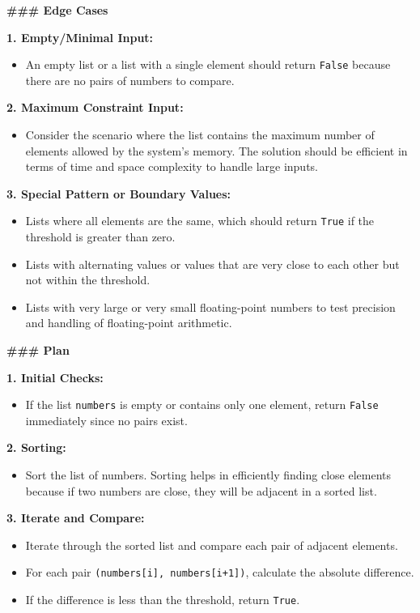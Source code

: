 \documentclass[11pt]{article}
\begin{document}
\begin{tcolorbox}[breakable, colback=white, colframe=black!70, boxrule=0.5pt, arc=2pt, left=4mm, right=4mm, top=3mm, bottom=3mm]
\textbf{\#\#\# Edge Cases}

\textbf{1. Empty/Minimal Input:}
\begin{itemize}
    \item An empty list or a list with a single element should return \texttt{False} because there are no pairs of numbers to compare.
\end{itemize}

\textbf{2. Maximum Constraint Input:}
\begin{itemize}
    \item Consider the scenario where the list contains the maximum number of elements allowed by the system's memory. The solution should be efficient in terms of time and space complexity to handle large inputs.
\end{itemize}

\textbf{3. Special Pattern or Boundary Values:}
\begin{itemize}
    \item Lists where all elements are the same, which should return \texttt{True} if the threshold is greater than zero.
    \item Lists with alternating values or values that are very close to each other but not within the threshold.
    \item Lists with very large or very small floating-point numbers to test precision and handling of floating-point arithmetic.
\end{itemize}

\textbf{\#\#\# Plan}

\textbf{1. Initial Checks:}
\begin{itemize}
    \item If the list \texttt{numbers} is empty or contains only one element, return \texttt{False} immediately since no pairs exist.
\end{itemize}

\textbf{2. Sorting:}
\begin{itemize}
    \item Sort the list of numbers. Sorting helps in efficiently finding close elements because if two numbers are close, they will be adjacent in a sorted list.
\end{itemize}

\textbf{3. Iterate and Compare:}
\begin{itemize}
    \item Iterate through the sorted list and compare each pair of adjacent elements.
    \item For each pair \texttt{(numbers[i], numbers[i+1])}, calculate the absolute difference.
    \item If the difference is less than the threshold, return \texttt{True}.
\end{itemize}


\end{tcolorbox}
\end{document}
